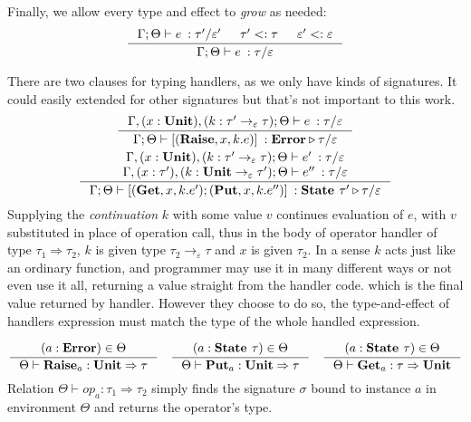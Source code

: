 \documentclass[declaration,shortabstract]{iithesis}
\theoremstyle{definition} \newtheorem{definition}{Definition}[section]
\newcommand{\types}[4][\Gamma;\Theta]{\ensuremath{{{#1} \vdash {#2} \: : {#3}/{#4}}}}
\newcommand{\arrow}[3]{{#1}\rightarrow_{#2}{#3}}
\newcommand{\optypes}[5][\Theta]{\ensuremath{{#1}\vdash{#2}_{#3} : {#4} \Rightarrow {#5}}}
\begin{document}
Finally, we allow every type and effect to \textit{grow} as needed:
$$
\inference{
    \types{e}{\tau'}{\varepsilon'} & \tau' <: \tau & \varepsilon' <: \varepsilon
}{
    \types{e}{\tau}{\varepsilon}
}
$$

There are two clauses for typing handlers, as we only have kinds of signatures. It could easily extended for other signatures but that's not important to this work.
\begin{gather*}
\begin{gathered}
\inference{
    \types[\Gamma,(x:\textbf{Unit}), (k:\arrow{\tau'}{\varepsilon}{\tau});\Theta]{e}{\tau}{\varepsilon}
}{ 
    \types{ [(\textbf{Raise}, x, k. e)]}{\textbf{Error}\triangleright \tau}{\varepsilon}
}
\\
\inference{
\types[\Gamma,(x:\textbf{Unit}), (k:\arrow{\tau'}{\varepsilon}{\tau});\Theta]{e'}{\tau}{\varepsilon} \\
\types[\Gamma,(x:\tau'),(k:\arrow{\textbf{Unit}}{\varepsilon}{\tau'});\Theta]{e''}{\tau}{\varepsilon} 
}{
\types{ [(\textbf{Get}, x, k. e');(\textbf{Put}, x, k. e'')]}{\textbf{State }\tau'\triangleright \tau}{\varepsilon} 
}
\end{gathered}
\end{gather*}
Supplying the \textit{continuation} $k$ with some value $v$ continues evaluation of $e$,
with $v$ substituted in place of operation call,
thus in the body of operator handler of type $\tau_1\Rightarrow\tau_2$, $k$ is given type
$\arrow{\tau_2}{\varepsilon}{\tau}$ and $x$ is given $\tau_2$.
In a sense $k$ acts just like an ordinary function, and programmer may use it
in many different ways or not even use it all, returning a value straight from the handler code.
which is the final value returned by handler.
However they choose to do so, the type-and-effect of handlers expression must match the type
of the whole handled expression.

\begin{gather*}
\begin{gathered}
\inference{
    (a : \textbf{Error}) \in \Theta
}{
    \optypes{\textbf{Raise}}{a}{\textbf{Unit}}{\tau}
}
\quad 
\inference{
    (a : \textbf{State }\tau) \in \Theta
}{
    \optypes{\textbf{Put}}{a}{\textbf{Unit}}{\tau}
}
\quad 
\inference{
    (a : \textbf{State }\tau) \in \Theta
}{
    \optypes{\textbf{Get}}{a}{\tau}{\textbf{Unit}}
}
\end{gathered}
\end{gather*}
Relation $\optypes{op}{a}{\tau_1}{\tau_2}$ simply finds the signature
$\sigma$ bound to instance $a$ in environment $\Theta$ and returns the operator's type.    
\end{document}
